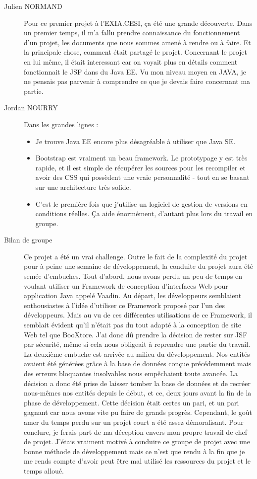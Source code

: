 \begin{description}
	\item[Julien NORMAND]
	Pour ce premier projet à l'EXIA.CESI, ça été une grande découverte. Dans un premier temps, il m'a fallu prendre connaissance du fonctionnement d'un projet, les documents que nous sommes amené à rendre ou à faire. Et la principale chose, comment était partagé le projet.
	Concernant le projet en lui même, il était interessant car on voyait plus en détails comment fonctionnait le JSF dans du Java EE. Vu mon niveau moyen en JAVA, je ne pensais pas parvenir à comprendre ce que je devais faire concernant ma partie.
	\item[Jordan NOURRY]
	Dans les grandes lignes :
		\begin{itemize}
			\item Je trouve Java EE encore plus désagréable à utiliser que Java SE.
			\item Bootstrap est vraiment un beau framework. Le prototypage y est très rapide, et il est simple de récupérer les sources pour les recompiler et avoir des CSS qui possèdent une vraie personnalité - tout en se basant sur une architecture très solide.
			\item C'est le première fois que j'utilise un logiciel de gestion de versions en conditions réelles. Ça aide énormément, d'autant plus lors du travail en groupe.
		\end{itemize}
	\item[Bilan de groupe]
	Ce projet a été un vrai challenge. Outre le fait de la complexité du projet pour à peine une semaine de développement, la conduite du projet aura été semée d’embuches. Tout d’abord, nous avons perdu un peu de temps en voulant utiliser un Framework de conception d’interfaces Web pour application Java appelé Vaadin. Au départ, les développeurs semblaient enthousiastes à l’idée d’utiliser ce Framework proposé par l’un des développeurs. Mais au vu de ces différentes utilisations de ce Framework, il semblait évident qu’il n’était pas du tout adapté à la conception de site Web tel que BooXtore. J’ai donc dû prendre la décision de rester sur JSF par sécurité, même si cela nous obligeait à reprendre une partie du travail. La deuxième embuche est arrivée au milieu du développement. Nos entités avaient été générées grâce à la base de données conçue précédemment mais des erreurs bloquantes insolvables nous empêchaient toute avancée. La décision a donc été prise de laisser tomber la base de données et de recréer nous-mêmes nos entités depuis le début, et ce, deux jours avant la fin de la phase de développement. Cette décision était certes un pari, et un pari gagnant car nous avons vite pu faire de grands progrès. Cependant, le goût amer du temps perdu sur un projet court a été assez démoralisant.
	Pour conclure, je ferais part de ma déception envers mon propre travail de chef de projet. J’étais vraiment motivé à conduire ce groupe de projet avec une bonne méthode de développement mais ce n’est que rendu à la fin que je me rends compte d’avoir peut être mal utilisé les ressources du projet et le temps alloué.

\end{description}
